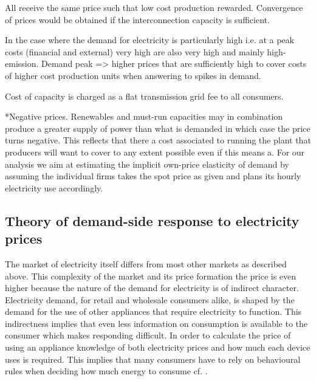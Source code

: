 All receive the same price such that low cost production rewarded. Convergence of prices would be obtained if the interconnection capacity is sufficient.

In the case where the demand for electricity is particularly high i.e. at a peak costs (financial and external) very high are also very high and mainly high-emission. Demand peak => higher prices that are sufficiently high to cover costs of higher cost production units 
when answering to spikes in demand.  

Cost of capacity is charged as a flat transmission grid fee to all consumers. 

*Negative prices. Renewables and must-run capacities may in combination produce a greater supply of power than what is demanded in which case the price turns negative. This reflects that there a cost associated to running the plant that producers will want to cover to any extent possible even if this means a. 
For our analysis we aim at estimating the implicit own-price elasticity of demand by assuming the individual firms takes the spot price as given and plans its hourly electricity use accordingly.
\smallskip \\


\subsection{Theory of demand-side response to electricity prices}
\label{subsec:t_demand}
The market of electricity itself differs from most other markets as described above. This complexity of the market and its price formation the price is even higher because the nature of the demand for electricity is of indirect character. Electricity demand, for retail and wholesale consumers alike, is shaped by the demand for the use of other appliances that require electricity to function. 
This indirectness implies that even less information on consumption is available to the consumer which makes responding difficult. In order to calculate the price of using an appliance knowledge of both electricity prices and how much each device uses is required. This implies that many consumers have to rely on behavioural rules when deciding how much energy to consume cf. \citep{kirschen2003demand}. 



